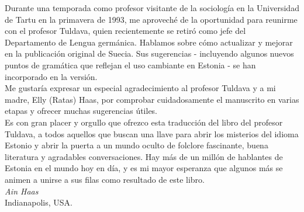 Durante una temporada como profesor visitante de la sociología en la Universidad de Tartu en la primavera de 1993, me aproveché de la oportunidad para reunirme con el profesor Tuldava, quien recientemente se retiró como jefe del Departamento de Lengua germánica. Hablamos sobre cómo actualizar y mejorar en la publicación original de Suecia. Sus sugerencias - incluyendo algunos nuevos puntos de gramática que reflejan el uso cambiante en Estonia - se han incorporado en la versión.\\

Me gustaría expresar un especial agradecimiento al profesor Tuldava y a mi madre, Elly (Ratas) Haas, por comprobar cuidadosamente el manuscrito en varias etapas y ofrecer muchas sugerencias útiles.\\

Es con gran placer y orgullo que ofrezco esta traducción del libro del profesor Tuldava, a todos aquellos que buscan una llave para abrir los misterios del idioma Estonio y abrir la puerta a un mundo oculto de folclore fascinante, buena literatura y agradables conversaciones. Hay más de un millón de hablantes de Estonia en el mundo hoy en día, y es mi mayor esperanza que algunos más se animen a unirse a sus filas como resultado de este libro.\\

\textit{Ain Haas}\\
Indianapolis, USA.



